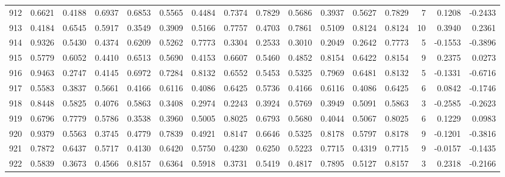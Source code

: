 \begin{tabular}{lrrrrrrrrrrrrrrr}
912 &      0.6621 &  0.4188 &  0.6937 &  0.6853 &  0.5565 &  0.4484 &  0.7374 &  0.7829 &  0.5686 &  0.3937 &   0.5627 &     0.7829 &      7 &                    0.1208 &                    -0.2433 \\
913 &      0.4184 &  0.6545 &  0.5917 &  0.3549 &  0.3909 &  0.5166 &  0.7757 &  0.4703 &  0.7861 &  0.5109 &   0.8124 &     0.8124 &     10 &                    0.3940 &                     0.2361 \\
914 &      0.9326 &  0.5430 &  0.4374 &  0.6209 &  0.5262 &  0.7773 &  0.3304 &  0.2533 &  0.3010 &  0.2049 &   0.2642 &     0.7773 &      5 &                   -0.1553 &                    -0.3896 \\
915 &      0.5779 &  0.6052 &  0.4410 &  0.6513 &  0.5690 &  0.4153 &  0.6607 &  0.5460 &  0.4852 &  0.8154 &   0.6422 &     0.8154 &      9 &                    0.2375 &                     0.0273 \\
916 &      0.9463 &  0.2747 &  0.4145 &  0.6972 &  0.7284 &  0.8132 &  0.6552 &  0.5453 &  0.5325 &  0.7969 &   0.6481 &     0.8132 &      5 &                   -0.1331 &                    -0.6716 \\
917 &      0.5583 &  0.3837 &  0.5661 &  0.4166 &  0.6116 &  0.4086 &  0.6425 &  0.5736 &  0.4166 &  0.6116 &   0.4086 &     0.6425 &      6 &                    0.0842 &                    -0.1746 \\
918 &      0.8448 &  0.5825 &  0.4076 &  0.5863 &  0.3408 &  0.2974 &  0.2243 &  0.3924 &  0.5769 &  0.3949 &   0.5091 &     0.5863 &      3 &                   -0.2585 &                    -0.2623 \\
919 &      0.6796 &  0.7779 &  0.5786 &  0.3538 &  0.3960 &  0.5005 &  0.8025 &  0.6793 &  0.5680 &  0.4044 &   0.5067 &     0.8025 &      6 &                    0.1229 &                     0.0983 \\
920 &      0.9379 &  0.5563 &  0.3745 &  0.4779 &  0.7839 &  0.4921 &  0.8147 &  0.6646 &  0.5325 &  0.8178 &   0.5797 &     0.8178 &      9 &                   -0.1201 &                    -0.3816 \\
921 &      0.7872 &  0.6437 &  0.5717 &  0.4130 &  0.6420 &  0.5750 &  0.4230 &  0.6250 &  0.5223 &  0.7715 &   0.4319 &     0.7715 &      9 &                   -0.0157 &                    -0.1435 \\
922 &      0.5839 &  0.3673 &  0.4566 &  0.8157 &  0.6364 &  0.5918 &  0.3731 &  0.5419 &  0.4817 &  0.7895 &   0.5127 &     0.8157 &      3 &                    0.2318 &                    -0.2166 \\

\end{tabular}
